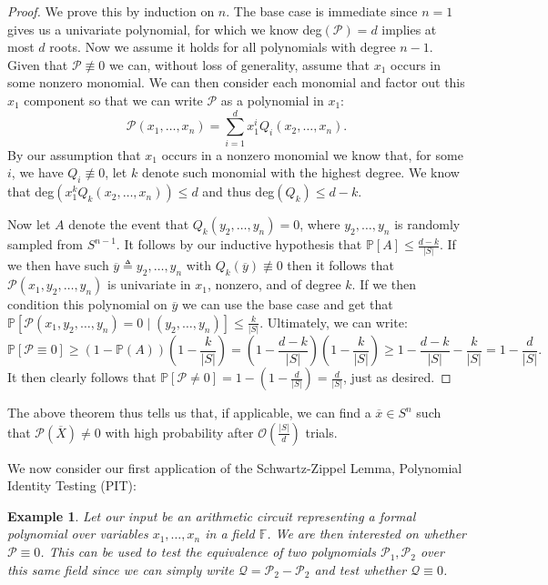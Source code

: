 \documentclass[11pt]{article}
\newtheorem*{example*}{Example}
\theoremstyle{definition}
\numberwithin{equation}{subsection}
\begin{document}
\begin{proof}
We prove this by induction on $n$. The base case is immediate since $n=1$  gives us a univariate polynomial, for which we know deg$(\mathcal{P})=d$ implies at most $d$ roots. Now we assume it holds for all polynomials with degree $n-1$. Given that $\mathcal{P}\not\equiv 0$ we can, without loss of generality, assume that $x_1$ occurs in some nonzero monomial. We can then consider each monomial and factor out this $x_1$ component so that we can write $\mathcal{P}$ as a polynomial in $x_1$: $$\mathcal{P}(x_1,\ldots,x_n)=\sum_{i=1}^d x_1^i Q_i(x_2,\ldots,x_n).$$ By our assumption that $x_1$ occurs in a nonzero monomial we know that, for some $i$, we have $Q_i\not\equiv 0$, let $k$ denote such monomial with the highest degree. We know that deg$(x_1^kQ_k(x_2,\ldots,x_n))\leq d$ and thus deg$(Q_k)\leq d-k$.

Now let $A$ denote the event that $Q_k(y_2,\ldots,y_n)=0$, where $y_2,\ldots,y_n$ is randomly sampled from $S^{n-1}$. It follows by our inductive hypothesis that $\mathbb{P}[A]\leq \frac{d-k}{|S|}$. If we then have such $\overline{y}\triangleq y_2,\ldots,y_n$ with $Q_k(\overline{y}) \not\equiv 0$ then it follows that $\mathcal{P}(x_1, y_2,\ldots,y_n)$ is univariate in $x_1$, nonzero, and of degree $k$. If we then condition this polynomial on $\overline{y}$ we can use the base case and get that $\mathbb{P}[\mathcal{P}(x_1,y_2,\ldots,y_n)=0\mid (y_2,\ldots,y_n)]\leq \frac{k}{|S|}.$ Ultimately, we can write: $$\mathbb{P}[\mathcal{P}\equiv0]\geq (1-\mathbb{P}(A))\left(1-\frac{k}{|S|}\right)=\left(1-\frac{d-k}{|S|}\right)\left(1-\frac{k}{|S|}\right)\geq 1-\frac{d-k}{|S|}-\frac{k}{|S|}=1-\frac{d}{|S|}.$$ It then clearly follows that $\mathbb{P}[\mathcal{P}\neq 0]=1-\left(1-\frac{d}{|S|}\right)=\frac{d}{|S|}$, just as desired.
\end{proof}

The above theorem thus tells us that, if applicable, we can find a $\overline{x}\in S^n$ such that $\mathcal{P}(\overline{X})\neq 0$ with high probability after $\mathcal{O}\left(\frac{|S|}{d}\right)$ trials.

We now consider our first application of the Schwartz-Zippel Lemma, Polynomial Identity Testing (PIT):

\begin{example*}
Let our input be an arithmetic circuit representing a formal polynomial over variables $x_1,\ldots,x_n$ in a field $\mathbb{F}$. We are then interested on whether $\mathcal{P}\equiv 0$. This can be used to test the equivalence of two polynomials $\mathcal{P}_1, \mathcal{P}_2$ over this same field since we can simply write $\mathcal{Q}=\mathcal{P}_2-\mathcal{P}_2$ and test whether $\mathcal{Q}\equiv 0$.
\end{example*}
\end{document}
